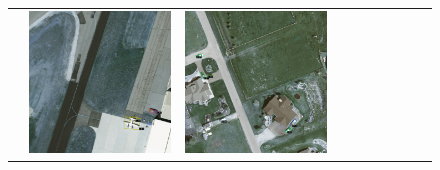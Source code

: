 \begin{figure}[H]
\begin{tabularx}{\textwidth}{c|*{9}{X}}
    &  \includegraphics[trim={650pt 120pt 170pt 720pt},clip,width=\linewidth]{images/015Results/02perm_exp/comp_images/rgbndvi/487.png}
    & \includegraphics[trim={230pt 200pt 680pt 725pt},clip,width=\linewidth]{images/015Results/02perm_exp/comp_images/rgbndvi/509.png}

\end{tabularx}
\end{figure}
